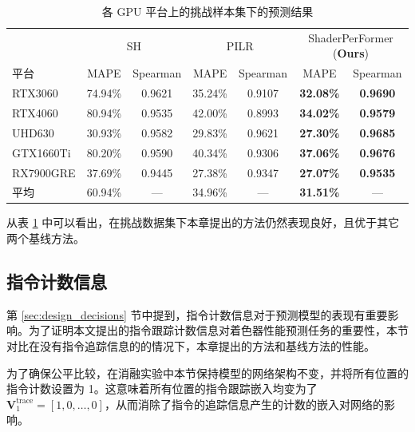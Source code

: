 \begin{table}[h]
    \centering
    \caption{各 GPU 平台上的挑战样本集下的预测结果}
    \label{table:challengeResults}
    \begin{tabular}{l|cccccc}
    \toprule
          ~   & \multicolumn{2}{c}{SH} & \multicolumn{2}{c}{PILR} & \multicolumn{2}{c}{ShaderPerFormer (\textbf{Ours})} \\
    平台       & MAPE       & Spearman    & MAPE       & Spearman    & MAPE            & Spearman          \\
    \midrule
    RTX3060   & 74.94\%     & 0.9621      & 35.24\%     & 0.9107      & \textbf{32.08\%}  & \textbf{0.9690}  \\
    RTX4060   & 80.94\%     & 0.9535      & 42.00\%     & 0.8993      & \textbf{34.02\%}  & \textbf{0.9579}  \\
    UHD630    & 30.93\%     & 0.9582      & 29.83\%     & 0.9621      & \textbf{27.30\%}  & \textbf{0.9685}  \\
    GTX1660Ti & 80.20\%     & 0.9590      & 40.34\%     & 0.9306      & \textbf{37.06\%}  & \textbf{0.9676}  \\
    RX7900GRE & 37.69\%     & 0.9445      & 27.38\%     & 0.9347      & \textbf{27.07\%}  & \textbf{0.9535}  \\
    \midrule
    平均       & 60.94\% & --- & 34.96\% & --- & \textbf{31.51\%} & --- \\
    \bottomrule
    \end{tabular}
\end{table}

{\added 从表 \ref{table:challengeResults} 中可以看出，在挑战数据集下本章提出的方法仍然表现良好，且优于其它两个基线方法。}

\subsection{指令计数信息}
\label{sec:ablation_trace}

{\amend 第 \ref{sec:design_decisions} 节中提到，指令计数信息对于预测模型的表现有重要影响。}为了证明{\amend 本文}提出的指令跟踪计数信息对着色器性能预测任务的重要性，本节对比在没有指令追踪信息的的情况下，{\amend 本章提出的}方法和基线方法的性能。

为了确保公平比较，在消融实验中{\amend 本节}保持模型的网络架构不变，并将所有位置的指令计数设置为 1。这意味着所有位置的指令跟踪嵌入均变为了 $\mathbf{V}^\text{trace}_{1} = [1, 0, \dots, 0]$，从而消除了指令的追踪信息产生的计数的嵌入对网络的影响。

